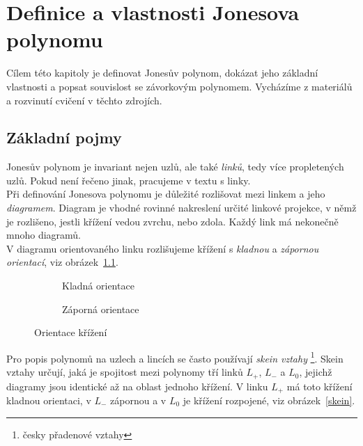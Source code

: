 
\chapter{Definice a vlastnosti Jonesova polynomu}
Cílem této kapitoly je definovat Jonesův polynom, dokázat jeho základní vlastnosti a popsat souvislost se závorkovým polynomem. Vycházíme z materiálů~\cite{cromwell2004knots, Adams2004, jones2005} a rozvinutí cvičení v těchto zdrojích.
\section{Základní pojmy}
Jonesův polynom je invariant nejen uzlů, ale také \emph{linků}, tedy více propletených uzlů. Pokud není řečeno jinak, pracujeme v textu s linky. \\
Při definování Jonesova polynomu je důležité rozlišovat mezi linkem a jeho \emph{diagramem}. Diagram je vhodné rovinné nakreslení určité linkové projekce, v němž je rozlišeno, jestli křížení vedou zvrchu, nebo zdola. Každý link má nekonečně mnoho diagramů.
\\
V diagramu orientovaného linku rozlišujeme křížení s \emph{kladnou} a \emph{zápornou orientací}, viz obrázek~\ref{orientace}.

\begin{figure}[h]  

\centering 
\begin{subfigure}[t]{0.4\linewidth}\centering
{} 
\caption{Kladná orientace} 
\end{subfigure}
\begin{subfigure}[t]{0.4\linewidth}\centering
{}  
\caption{Záporná orientace}
\end{subfigure}
\caption{Orientace křížení} \label{orientace}
\end{figure}  


Pro popis polynomů na uzlech a lincích se často používají \emph{skein vztahy} \footnote{česky přadenové vztahy}.
Skein vztahy určují, jaká je spojitost mezi polynomy tří linků $L_+$, $ L_-$ a $L_0$, jejichž diagramy jsou identické až na oblast jednoho křížení. V linku $L_+$ má toto křížení kladnou orientaci, v $L_-$ zápornou a v $L_0$ je křížení rozpojené, viz obrázek~\ref{skein}.

